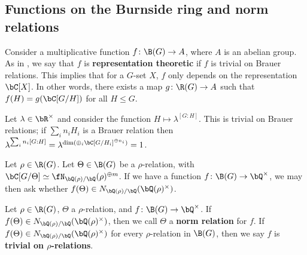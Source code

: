 \subsection{Functions on the Burnside ring and norm relations}\label{sec-norm-rels}

Consider a multiplicative function $f \colon \B(G) \to A$, where $A$ is an abelian group. As in \cite{reg-const}, we say that $f$ is \textbf{representation theoretic} if $f$ is trivial on Brauer relations. This implies that for a $G$-set $X$, $f$ only depends on the representation $\bC[X]$. In other words, there exists a map $g \colon \R(G) \to A$ such that $f(H) = g(\bC[G / H])$ for all $H \leq G$. 

\begin{example}
  Let $\lambda \in \bR^{\times}$ and consider the function $H \mapsto \lambda^{[G : H]}$. This is trivial on Brauer relations;  if $\sum_i n_i H_i$ is a Brauer relation then $\lambda^{\sum_i n_i [G : H]} = \lambda^{\dim( \oplus_i \bC[G / H_i]^{\oplus n_i})} = 1$.
\end{example}

Let $\rho \in \R(G)$. Let $\Theta \in \B(G)$ be a $\rho$-relation, with $\bC[G / \Theta] \simeq \repnorm{\rho}^{\oplus m}$. If we have a function $f \colon \B(G) \to \bQ^{\times}$, we may then ask whether $f(\Theta) \in \fieldnorm{\rho}$. 


\begin{defn}
Let $\rho \in \R(G)$, $\Theta$ a $\rho$-relation, and $f \colon \B(G) \to \bQ^{\times}$. If $f(\Theta) \in \fieldnorm{\rho}$, then we call $\Theta$ a \textbf{norm relation} for $f$. 
If $f(\Theta) \in \fieldnorm{\rho}$ for every $\rho$-relation in $\B(G)$, then we say $f$ is \textbf{trivial on $\rho$-relations}.

\end{defn}


